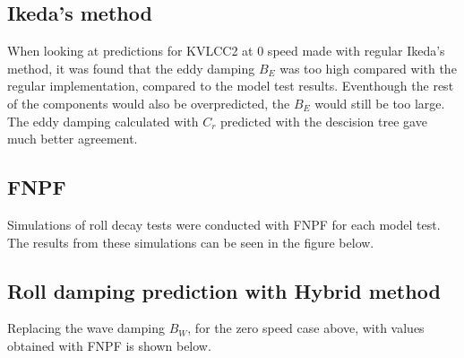     \subsection{Ikeda's method}\label{ikedas-method}

    When looking at predictions for KVLCC2 at 0 speed made with regular
Ikeda's method, it was found that the eddy damping \(B_E\) was too high
compared with the regular implementation, compared to the model test
results. Eventhough the rest of the components would also be
overpredicted, the \(B_E\) would still be too large. The eddy damping
calculated with \(C_r\) predicted with the descision tree gave much
better agreement.

    \begin{figure}
        \begin{center}\end{center}
        \caption{}
        \label{fig:}
    \end{figure}
    
    \subsection{FNPF}\label{fnpf}

Simulations of roll decay tests were conducted with FNPF for each model
test. The results from these simulations can be seen in the figure
below.

    \begin{figure}
        \begin{center}\end{center}
        \caption{}
        \label{fig:}
    \end{figure}
    
    \subsection{Roll damping prediction with Hybrid
method}\label{roll-damping-prediction-with-hybrid-method}
Replacing the wave damping $B_W$, for the zero speed case above, with values obtained with FNPF is shown below. 
    \begin{figure}
        \begin{center}\end{center}
        \caption{}
        \label{fig:}
    \end{figure}
    

